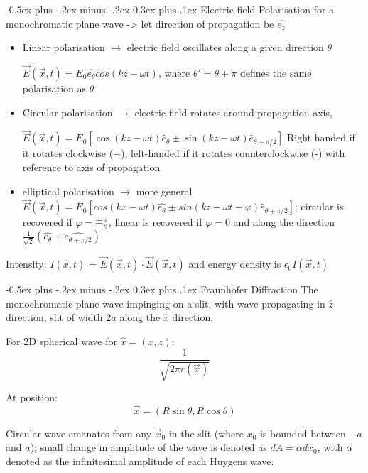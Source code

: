 \documentclass[a4paper,11pt,portrait]{article}
\makeatletter
\renewcommand{\subsection}{\@startsection{subsection}{2}{0mm}%
                                {-0.5ex plus -.2ex minus -.2ex}%
                                {0.3ex plus .1ex}%
                                {\normalfont\footnotesize\bfseries}}
\makeatother
\begin{document}
\begin{multicols}{3}
\subsection{Electric field}
Polarisation for a monochromatic plane wave -> let direction of propagation be $\hat{e_z}$ 
\begin{itemize}
    \item Linear polarisation $\rightarrow$ electric field oscillates along a given direction $\theta$
    
    $\overrightarrow{E}(\overrightarrow{x},t) = E_0 \hat{e_\theta} cos(kz - \omega t)$, where $\theta' = \theta  + \pi$ defines the same polarisation as $\theta$
    \item Circular polarisation $\rightarrow$ electric field rotates around propagation  axis,
    
    $\vec{E}(\vec{x},t) = E_0 \left[\cos(kz - \omega t)\hat{e}_\theta \pm \sin(kz - \omega t)\hat{e}_{\theta+\pi/2}\right]$ Right handed if it rotates clockwise (+), left-handed if it rotates counterclockwise (-) with reference to axis of propagation
    \item elliptical polarisation $\rightarrow$ more general $\overrightarrow{E}(\overrightarrow{x},t) = E_0 [cos(kx - \omega t)\hat{e_\theta} \pm sin(kz - \omega t + \varphi)\hat{e}_{\theta+\pi/2}]$; circular is recovered if $\varphi = \mp \frac{\pi}{2}$, linear is recovered if $\varphi = 0$ and along the direction $\frac{1}{\sqrt2}(\hat{e_{\theta}} + \hat{e_{\theta + \pi/2}})$
\end{itemize}
Intensity: $I(\hat{x},t)$ = $\overrightarrow{E}(\overrightarrow{x},t)\cdot\overrightarrow{E}(\overrightarrow{x},t)$ and energy density is $\epsilon_0I(\overrightarrow{x},t)$

\subsection{Fraunhofer Diffraction}
The monochromatic plane wave impinging on a slit, with wave propagating in $\hat{z}$ direction, slit of width $2a$ along the $\hat{x}$ direction.

For 2D spherical wave for $\hat{x} = (x,z)$:
$$
\frac{1}{\sqrt{2\pi r(\vec{x})}}
$$

At position:
$$
\vec{x} = (R\sin\theta, R\cos\theta)
$$

Circular wave emanates from any $\vec{x}_0$ in the slit (where $x_0$ is bounded between $-a$ and $a$); small change in amplitude of the wave is denoted as $dA = \alpha dx_0$, with $\alpha$ denoted as the infinitesimal amplitude of each Huygens wave.


\end{multicols}
\end{document}
